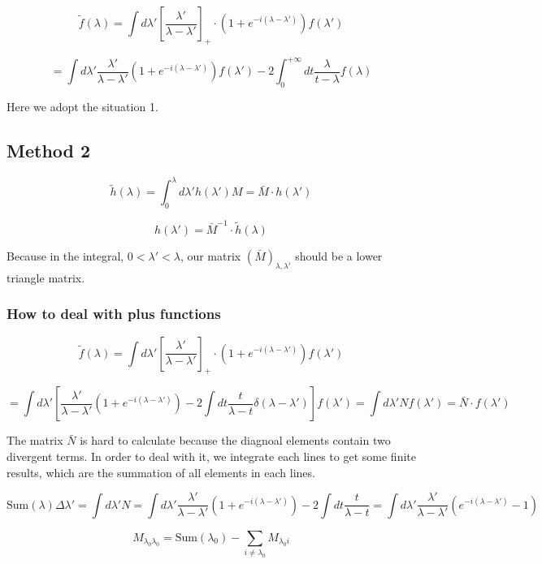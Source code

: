 \documentclass{article}
\begin{document}
\begin{equation}
    \tilde{f}(\lambda) = \int d \lambda' [\frac{\lambda'}{\lambda - \lambda'}]_{+} \cdot (1+e^{-i(\lambda - \lambda')}) f(\lambda') 
\end{equation}

\begin{equation}
    = \int d \lambda' \frac{\lambda'}{\lambda - \lambda'} (1+e^{-i(\lambda - \lambda')}) f(\lambda') - 2 \int_0^{+\infty} dt \frac{\lambda}{t - \lambda} f(\lambda)
\end{equation}

Here we adopt the situation 1.

\subsection{Method 2}
\begin{equation}
    \tilde{h}(\lambda) = \int_{0}^{\lambda} d \lambda'  h(\lambda') M = \bar{M} \cdot h(\lambda')
\end{equation}

\begin{equation}
    h(\lambda') = \bar{M}^{-1} \cdot \tilde{h}(\lambda)
\end{equation}

Because in the integral, $0 < \lambda' < \lambda$, our matrix $(\bar{M})_{\lambda, \lambda'}$ should be a lower triangle matrix.

\subsubsection{How to deal with plus functions}
\begin{equation}
    \tilde{f}(\lambda) = \int d \lambda' [\frac{\lambda'}{\lambda - \lambda'}]_{+} \cdot (1+e^{-i(\lambda - \lambda')}) f(\lambda') 
\end{equation}

\begin{equation}
    = \int d \lambda' [ \frac{\lambda'}{\lambda - \lambda'} (1+e^{-i(\lambda - \lambda')}) - 2 \int dt \frac{t}{\lambda - t} \delta(\lambda - \lambda') ] f(\lambda') = \int d \lambda' N f(\lambda') = \bar{N} \cdot f(\lambda')
\end{equation}

The matrix $\bar{N}$ is hard to calculate because the diagnoal elements contain two divergent terms. In order to deal with it, we integrate each lines to get some finite results, which are the summation of all elements in each lines.

\begin{equation}
    \text{Sum}(\lambda) \Delta \lambda' = \int d \lambda' N = \int d \lambda'  \frac{\lambda'}{\lambda - \lambda'} (1+e^{-i(\lambda - \lambda')})  - 2 \int dt \frac{t}{\lambda - t} = \int d \lambda'  \frac{\lambda'}{\lambda - \lambda'} (e^{-i(\lambda - \lambda')} - 1)
\end{equation}

\begin{equation}
    M_{\lambda_0 \lambda_0} = \text{Sum}(\lambda_0) - \sum_{i \neq \lambda_0} M_{\lambda_0 i}
\end{equation}
\end{document}
